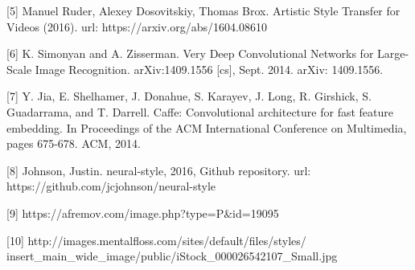 \documentclass[10pt,twocolumn,letterpaper]{article}
\begin{document}
[5] Manuel Ruder, Alexey Dosovitskiy, Thomas Brox. Artistic Style Transfer for Videos (2016). url: https://arxiv.org/abs/1604.08610

[6] K. Simonyan and A. Zisserman. Very Deep Convolutional Networks for Large-Scale Image Recognition. arXiv:1409.1556 [cs], Sept. 2014. arXiv: 1409.1556.

[7] Y. Jia, E. Shelhamer, J. Donahue, S. Karayev, J. Long, R. Girshick, S. Guadarrama, and T. Darrell. Caffe: Convolutional
architecture for fast feature embedding. In Proceedings of the ACM International Conference on Multimedia, pages 675-678. ACM, 2014.

[8] Johnson, Justin. neural-style, 2016, Github repository. url: https://github.com/jcjohnson/neural-style

[9] https://afremov.com/image.php?type=P\&id=19095

[10] http://images.mentalfloss.com/sites/default/files/styles/
insert\_main\_wide\_image/public/iStock\_000026542107\_Small.jpg

{\small


}
\end{document}
